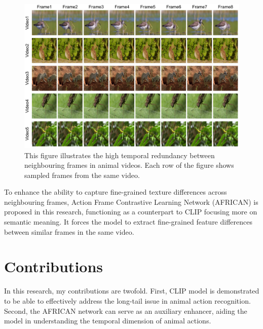 \begin{figure}[ht]
    \centering
    \includegraphics[width=1\textwidth]{assets/imgs/1_2_FrameComparison}
    \caption[Temporal Redundancy]{This figure illustrates the high temporal redundancy between neighbouring frames in animal videos. Each row of the figure shows sampled frames from the same video.}
    \label{fig:1_2_FrameComparison}
\end{figure}

To enhance the ability to capture fine-grained texture differences across neighbouring frames, Action Frame Contrastive Learning Network (AFRICAN) is proposed in this research, functioning as a counterpart to CLIP focusing more on semantic meaning. It forces the model to extract fine-grained feature differences between similar frames in the same video. 

\section{Contributions}
In this research, my contributions are twofold. First, CLIP model is demonstrated to be able to effectively address the long-tail issue in animal action recognition. Second, the AFRICAN network can serve as an auxiliary enhancer, aiding the model in understanding the temporal dimension of animal actions.





